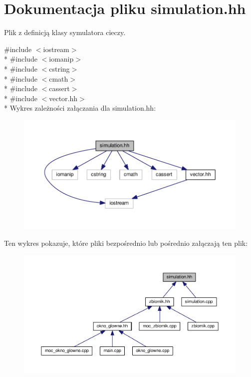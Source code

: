 \hypertarget{simulation_8hh}{\section{Dokumentacja pliku simulation.\-hh}
\label{simulation_8hh}
}


Plik z definicją klasy symulatora cieczy.  


{\ttfamily \#include $<$iostream$>$}\\*
{\ttfamily \#include $<$iomanip$>$}\\*
{\ttfamily \#include $<$cstring$>$}\\*
{\ttfamily \#include $<$cmath$>$}\\*
{\ttfamily \#include $<$cassert$>$}\\*
{\ttfamily \#include $<$vector.\-hh$>$}\\*
Wykres zależności załączania dla simulation.\-hh\-:\nopagebreak
\begin{figure}[H]
\begin{center}
\leavevmode
\includegraphics[width=350pt]{simulation_8hh__incl}
\end{center}
\end{figure}
Ten wykres pokazuje, które pliki bezpośrednio lub pośrednio załączają ten plik\-:
\nopagebreak
\begin{figure}[H]
\begin{center}
\leavevmode
\includegraphics[width=350pt]{simulation_8hh__dep__incl}
\end{center}
\end{figure}
